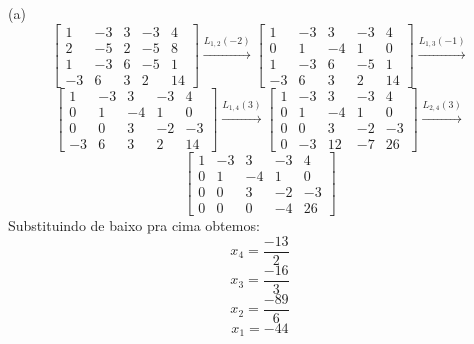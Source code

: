 \documentclass{homework}
\begin{document}
\exercise
(a) 
\[\left[\begin{array}{cccc|c}
1 & -3 & 3 & -3 & 4\\
2 & -5 & 2 & -5 & 8\\
1 & -3 & 6 & -5 & 1\\
-3 & 6 & 3 & 2 & 14
\end{array}\right] \xrightarrow{L_{1,2}(-2)}
\left[\begin{array}{cccc|c}
1 & -3 & 3 & -3 & 4\\
0 & 1 & -4 & 1 & 0\\
1 & -3 & 6 & -5 & 1\\
-3 & 6 & 3 & 2 & 14
\end{array}\right] \xrightarrow{L_{1,3}(-1)}\]
\[\left[\begin{array}{cccc|c}
1 & -3 & 3 & -3 & 4\\
0 & 1 & -4 & 1 & 0\\
0 & 0 & 3 & -2 & -3\\
-3 & 6 & 3 & 2 & 14
\end{array}\right] \xrightarrow{L_{1,4}(3)}
\left[\begin{array}{cccc|c}
1 & -3 & 3 & -3 & 4\\
0 & 1 & -4 & 1 & 0\\
0 & 0 & 3 & -2 & -3\\
0 & -3 & 12 & -7 & 26
\end{array}\right] \xrightarrow{L_{2,4}(3)}
\]
\[\left[\begin{array}{cccc|c}
1 & -3 & 3 & -3 & 4\\
0 & 1 & -4 & 1 & 0\\
0 & 0 & 3 & -2 & -3\\
0 & 0 & 0 & -4 & 26
\end{array}\right]
\]
Substituindo de baixo pra cima obtemos:
\[x_4 = \frac{-13}{2}\]
\[x_3 = \frac{-16}{3}\]
\[x_2 = \frac{-89}{6}\]
\[x_1 = -44\]
\end{document}
